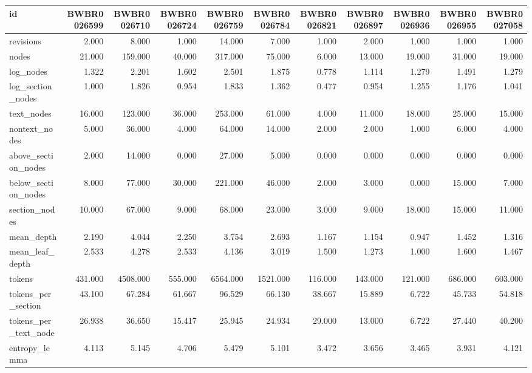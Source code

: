 \begin{tabular}{lrrrrrrrrrr}
\toprule
id & BWBR0026599 & BWBR0026710 & BWBR0026724 & BWBR0026759 & BWBR0026784 & BWBR0026821 & BWBR0026897 & BWBR0026936 & BWBR0026955 & BWBR0027058 \\
\midrule
revisions & 2.000 & 8.000 & 1.000 & 14.000 & 7.000 & 1.000 & 2.000 & 1.000 & 1.000 & 1.000 \\
\cline{1-11}
nodes & 21.000 & 159.000 & 40.000 & 317.000 & 75.000 & 6.000 & 13.000 & 19.000 & 31.000 & 19.000 \\
\cline{1-11}
log\_nodes & 1.322 & 2.201 & 1.602 & 2.501 & 1.875 & 0.778 & 1.114 & 1.279 & 1.491 & 1.279 \\
\cline{1-11}
log\_section\_nodes & 1.000 & 1.826 & 0.954 & 1.833 & 1.362 & 0.477 & 0.954 & 1.255 & 1.176 & 1.041 \\
\cline{1-11}
text\_nodes & 16.000 & 123.000 & 36.000 & 253.000 & 61.000 & 4.000 & 11.000 & 18.000 & 25.000 & 15.000 \\
\cline{1-11}
nontext\_nodes & 5.000 & 36.000 & 4.000 & 64.000 & 14.000 & 2.000 & 2.000 & 1.000 & 6.000 & 4.000 \\
\cline{1-11}
above\_section\_nodes & 2.000 & 14.000 & 0.000 & 27.000 & 5.000 & 0.000 & 0.000 & 0.000 & 0.000 & 0.000 \\
\cline{1-11}
below\_section\_nodes & 8.000 & 77.000 & 30.000 & 221.000 & 46.000 & 2.000 & 3.000 & 0.000 & 15.000 & 7.000 \\
\cline{1-11}
section\_nodes & 10.000 & 67.000 & 9.000 & 68.000 & 23.000 & 3.000 & 9.000 & 18.000 & 15.000 & 11.000 \\
\cline{1-11}
mean\_depth & 2.190 & 4.044 & 2.250 & 3.754 & 2.693 & 1.167 & 1.154 & 0.947 & 1.452 & 1.316 \\
\cline{1-11}
mean\_leaf\_depth & 2.533 & 4.278 & 2.533 & 4.136 & 3.019 & 1.500 & 1.273 & 1.000 & 1.600 & 1.467 \\
\cline{1-11}
tokens & 431.000 & 4508.000 & 555.000 & 6564.000 & 1521.000 & 116.000 & 143.000 & 121.000 & 686.000 & 603.000 \\
\cline{1-11}
tokens\_per\_section & 43.100 & 67.284 & 61.667 & 96.529 & 66.130 & 38.667 & 15.889 & 6.722 & 45.733 & 54.818 \\
\cline{1-11}
tokens\_per\_text\_node & 26.938 & 36.650 & 15.417 & 25.945 & 24.934 & 29.000 & 13.000 & 6.722 & 27.440 & 40.200 \\
\cline{1-11}
entropy\_lemma & 4.113 & 5.145 & 4.706 & 5.479 & 5.101 & 3.472 & 3.656 & 3.465 & 3.931 & 4.121 \\

\end{tabular}
